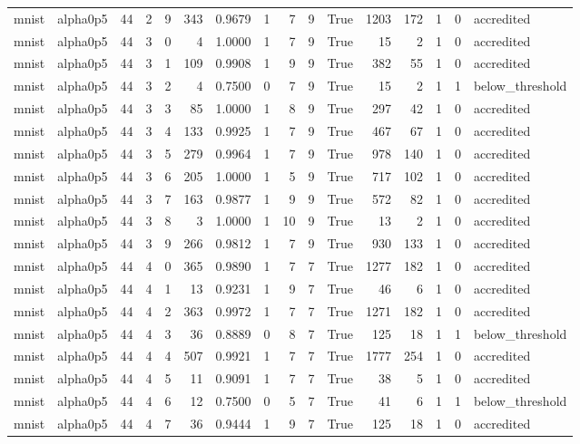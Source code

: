 \begin{tabular}{llrrrrrrrrrrrrrl}
mnist & alpha0p5 & 44 & 2 & 9 & 343 & 0.9679 & 1 & 7 & 9 & True & 1203 & 172 & 1 & 0 & accredited \\
mnist & alpha0p5 & 44 & 3 & 0 & 4 & 1.0000 & 1 & 7 & 9 & True & 15 & 2 & 1 & 0 & accredited \\
mnist & alpha0p5 & 44 & 3 & 1 & 109 & 0.9908 & 1 & 9 & 9 & True & 382 & 55 & 1 & 0 & accredited \\
mnist & alpha0p5 & 44 & 3 & 2 & 4 & 0.7500 & 0 & 7 & 9 & True & 15 & 2 & 1 & 1 & below\_threshold \\
mnist & alpha0p5 & 44 & 3 & 3 & 85 & 1.0000 & 1 & 8 & 9 & True & 297 & 42 & 1 & 0 & accredited \\
mnist & alpha0p5 & 44 & 3 & 4 & 133 & 0.9925 & 1 & 7 & 9 & True & 467 & 67 & 1 & 0 & accredited \\
mnist & alpha0p5 & 44 & 3 & 5 & 279 & 0.9964 & 1 & 7 & 9 & True & 978 & 140 & 1 & 0 & accredited \\
mnist & alpha0p5 & 44 & 3 & 6 & 205 & 1.0000 & 1 & 5 & 9 & True & 717 & 102 & 1 & 0 & accredited \\
mnist & alpha0p5 & 44 & 3 & 7 & 163 & 0.9877 & 1 & 9 & 9 & True & 572 & 82 & 1 & 0 & accredited \\
mnist & alpha0p5 & 44 & 3 & 8 & 3 & 1.0000 & 1 & 10 & 9 & True & 13 & 2 & 1 & 0 & accredited \\
mnist & alpha0p5 & 44 & 3 & 9 & 266 & 0.9812 & 1 & 7 & 9 & True & 930 & 133 & 1 & 0 & accredited \\
mnist & alpha0p5 & 44 & 4 & 0 & 365 & 0.9890 & 1 & 7 & 7 & True & 1277 & 182 & 1 & 0 & accredited \\
mnist & alpha0p5 & 44 & 4 & 1 & 13 & 0.9231 & 1 & 9 & 7 & True & 46 & 6 & 1 & 0 & accredited \\
mnist & alpha0p5 & 44 & 4 & 2 & 363 & 0.9972 & 1 & 7 & 7 & True & 1271 & 182 & 1 & 0 & accredited \\
mnist & alpha0p5 & 44 & 4 & 3 & 36 & 0.8889 & 0 & 8 & 7 & True & 125 & 18 & 1 & 1 & below\_threshold \\
mnist & alpha0p5 & 44 & 4 & 4 & 507 & 0.9921 & 1 & 7 & 7 & True & 1777 & 254 & 1 & 0 & accredited \\
mnist & alpha0p5 & 44 & 4 & 5 & 11 & 0.9091 & 1 & 7 & 7 & True & 38 & 5 & 1 & 0 & accredited \\
mnist & alpha0p5 & 44 & 4 & 6 & 12 & 0.7500 & 0 & 5 & 7 & True & 41 & 6 & 1 & 1 & below\_threshold \\
mnist & alpha0p5 & 44 & 4 & 7 & 36 & 0.9444 & 1 & 9 & 7 & True & 125 & 18 & 1 & 0 & accredited \\

\end{tabular}
